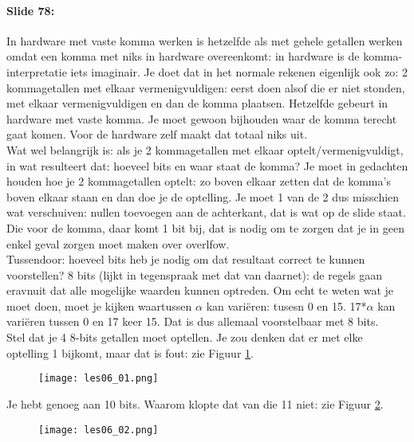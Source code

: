 \documentclass[10pt,a4paper]{book}
\begin{document}
\paragraph{Slide 78:} In hardware met vaste komma werken is hetzelfde als met gehele getallen werken omdat een komma met niks in hardware overeenkomt: in hardware is de komma-interpretatie iets imaginair. Je doet dat in het normale rekenen eigenlijk ook zo: 2 kommagetallen met elkaar vermenigvuldigen: eerst doen alsof die er niet stonden, met elkaar vermenigvuldigen en dan de komma plaatsen. Hetzelfde gebeurt in hardware met vaste komma. Je moet gewoon bijhouden waar de komma terecht gaat komen. Voor de hardware zelf maakt dat totaal niks uit.\\
Wat wel belangrijk is: als je 2 kommagetallen met elkaar optelt/vermenigvuldigt, in wat resulteert dat: hoeveel bits en waar staat de komma? Je moet in gedachten houden hoe je 2 kommagetallen optelt: zo boven elkaar zetten dat de komma's boven elkaar staan en dan doe je de optelling. Je moet 1 van de 2 dus misschien wat verschuiven: nullen toevoegen aan de achterkant, dat is wat op de slide staat. Die voor de komma, daar komt 1 bit bij, dat is nodig om te zorgen dat je in geen enkel geval zorgen moet maken over overlfow.\\
Tussendoor: hoeveel bits heb je nodig om dat resultaat correct te kunnen voorstellen? 8 bits (lijkt in tegenspraak met dat van daarnet): de regels gaan eravnuit dat alle mogelijke waarden kunnen optreden. Om echt te weten wat je moet doen, moet je kijken waartussen $\alpha$ kan vari\"eren: tusesn 0 en 15. 17*$\alpha$ kan vari\"eren tussen 0 en 17 keer 15. Dat is dus allemaal voorstelbaar met 8 bits.\\
Stel dat je 4 8-bits getallen moet optellen. Je zou denken dat er met elke optelling 1 bijkomt, maar dat is fout: zie Figuur \ref{les06_01}.

\begin{figure}[ht!]
\centering
\texttt{[image: les06\_01.png]}
\label{les06_01}
\end{figure}

Je hebt genoeg aan 10 bits. Waarom klopte dat van die 11 niet: zie Figuur \ref{les06_02}.

\begin{figure}[ht!]
\centering
\texttt{[image: les06\_02.png]}
\label{les06_02}
\end{figure}
\end{document}
